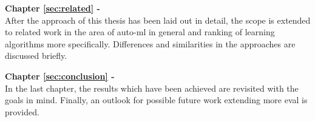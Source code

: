 \textbf{Chapter \ref{sec:related} - } \\[0.2em]
After the approach of this thesis has been laid out in detail, the scope is extended to related work in the area of auto-ml in general and ranking of learning algorithms more specifically. Differences and similarities in the approaches are discussed briefly.

\textbf{Chapter \ref{sec:conclusion} - } \\[0.2em]
In the last chapter, the results which have been achieved are revisited with the goals in mind. Finally, an outlook for possible future work extending more eval is provided.

